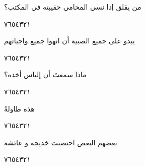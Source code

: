 \documentclass[11pt, a4paper]{article}
\begin{document}
{\vspace{0.5\baselineskip}\begin{flushright}
\textarabic{من يقلق إذا نسي المحامي حقيبته في المكتب؟}
\end{flushright}

\begin{center}
        \hfill\textarabic{٧}\hfill\textarabic{٦}\hfill\textarabic{٥}\hfill\textarabic{٤}\hfill\textarabic{٣}\hfill\textarabic{٢}\hfill\textarabic{١}
        \end{center}


\vspace{0.5\baselineskip}\begin{flushright}
\textarabic{يبدو على جميع الصبية أن انهوا جميع واجباتهم}
\end{flushright}

\begin{center}
        \hfill\textarabic{٧}\hfill\textarabic{٦}\hfill\textarabic{٥}\hfill\textarabic{٤}\hfill\textarabic{٣}\hfill\textarabic{٢}\hfill\textarabic{١}
        \end{center}


\vspace{0.5\baselineskip}\begin{flushright}
\textarabic{ماذا سمعتَ أن إلياس أخذه؟}
\end{flushright}

\begin{center}
        \hfill\textarabic{٧}\hfill\textarabic{٦}\hfill\textarabic{٥}\hfill\textarabic{٤}\hfill\textarabic{٣}\hfill\textarabic{٢}\hfill\textarabic{١}
        \end{center}


\vspace{0.5\baselineskip}\begin{flushright}
\textarabic{هذه طاولةً}
\end{flushright}

\begin{center}
        \hfill\textarabic{٧}\hfill\textarabic{٦}\hfill\textarabic{٥}\hfill\textarabic{٤}\hfill\textarabic{٣}\hfill\textarabic{٢}\hfill\textarabic{١}
        \end{center}


\vspace{0.5\baselineskip}\begin{flushright}
\textarabic{بعضهم البعض احتضنت خديجة و عائشة}
\end{flushright}

\begin{center}
        \hfill\textarabic{٧}\hfill\textarabic{٦}\hfill\textarabic{٥}\hfill\textarabic{٤}\hfill\textarabic{٣}\hfill\textarabic{٢}\hfill\textarabic{١}
        \end{center}


}
\end{document}
